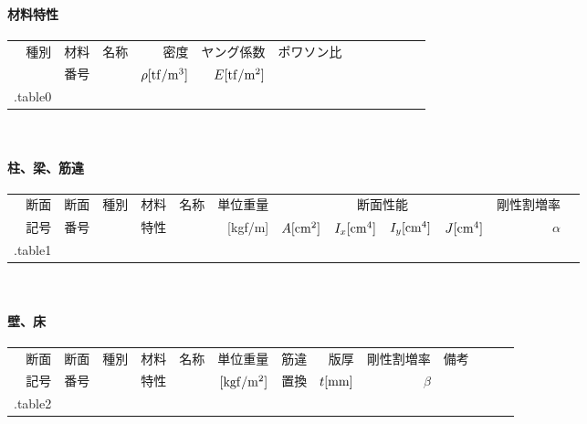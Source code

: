 \paragraph{材料特性}
{\footnotesize
\begin{tabular}{r r r r r r r r r r r r} \toprule
    種別 & 材料 & 名称 & 密度 & ヤング係数 & ポワソン比 \\
         & 番号 &      & $\rho{\rm [tf/m^3]}$ & $E {\rm [tf/m^2]}$ & \\ \midrule
{{.table0}}
\end{tabular}\\}

\paragraph{柱、梁、筋違}
{\footnotesize
\begin{tabular}{r r r r r r r r r r r r} \toprule
    断面 & 断面 & 種別 & 材料 & 名称 & 単位重量 & \multicolumn{4}{c}{断面性能} & 剛性割増率 \\
    記号 & 番号 &      & 特性 & & [kgf/m] & $A{\rm [cm^2]}$ & $I_x {\rm [cm^4]}$ & $I_y {\rm [cm^4]}$ & $J {\rm [cm^4]}$ & $\alpha$ \\ \midrule
{{.table1}}
\end{tabular}\\}

\paragraph{壁、床}
{\footnotesize
\begin{tabular}{r r r r r r r r r r r r r} \toprule
    断面 & 断面 & 種別 & 材料 & 名称 & 単位重量 & 筋違 & 版厚 & 剛性割増率 & 備考\\
    記号 & 番号 &      & 特性 &    & ${\rm [kgf/m^2]}$ & 置換 & $t{\rm [mm]}$ & $\beta$ & \\ \midrule
{{.table2}}
\end{tabular}\\
}
\newpage
